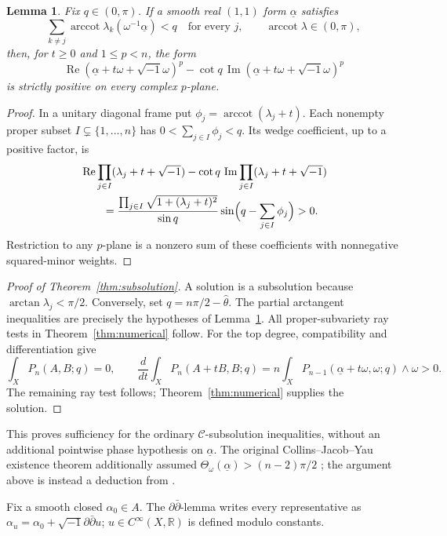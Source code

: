 \documentclass[12pt,reqno]{amsart}
\numberwithin{equation}{section}
\theoremstyle{plain}
\newtheorem{lemma}[theorem]{Lemma}
\theoremstyle{definition}
\theoremstyle{remark}
\newcommand{\ii}{\sqrt{-1}}
\newcommand{\ddc}{\ii\partial\bar\partial}
\newcommand{\R}{\mathbb R}
\newcommand{\Rea}{\operatorname{Re}}
\newcommand{\Ima}{\operatorname{Im}}
\begin{document}
\begin{lemma}\label{lem:positive}
Fix $q\in(0,\pi)$. If a smooth real $(1,1)$ form $\underline\alpha$ satisfies
\[
 \sum_{k\ne j}\operatorname{arccot}\lambda_k(\omega^{-1}\underline\alpha)<q
 \quad\text{for every }j,
 \qquad\operatorname{arccot}\lambda\in(0,\pi),
\]
then, for $t\ge0$ and $1\le p<n$, the form
\[
 \Rea(\underline\alpha+t\omega+\ii\omega)^p
 -\cot q\,\Ima(\underline\alpha+t\omega+\ii\omega)^p
\]
is strictly positive on every complex $p$-plane.
\end{lemma}
\begin{proof}\label{proof:positive}
In a unitary diagonal frame put $\phi_j=\operatorname{arccot}(\lambda_j+t)$.
Each nonempty proper subset $I\subsetneq\{1,\ldots,n\}$ has $0<\sum_{j\in I}\phi_j<q$.
Its wedge coefficient, up to a positive factor, is
\[
 \begin{aligned}
 &\Rea\prod_{j\in I}(\lambda_j+t+\ii)
 -\cot q\,\Ima\prod_{j\in I}(\lambda_j+t+\ii)\\
 &\qquad=\frac{\prod_{j\in I}\sqrt{1+(\lambda_j+t)^2}}{\sin q}
   \sin\Bigl(q-\sum_{j\in I}\phi_j\Bigr)>0.
 \end{aligned}
\]
Restriction to any $p$-plane is a nonzero sum of these coefficients with nonnegative squared-minor weights.
\end{proof}

\begin{proof}[Proof of Theorem~\ref{thm:subsolution}]\label{proof:subsolution}
A solution is a subsolution because $\arctan\lambda_j<\pi/2$.
Conversely, set $q=n\pi/2-\widehat\theta$. The partial arctangent inequalities are precisely the hypotheses of Lemma~\ref{lem:positive}. All proper-subvariety ray tests in Theorem~\ref{thm:numerical} follow. For the top degree, compatibility and differentiation give
\[
 \int_X P_n(A,B;q)=0,\qquad
 \frac{d}{dt}\int_XP_n(A+tB,B;q)
 =n\int_XP_{n-1}(\underline\alpha+t\omega,\omega;q)\wedge\omega>0.
\]
The remaining ray test follows; Theorem~\ref{thm:numerical} supplies the solution.
\end{proof}
This proves sufficiency for the ordinary $\mathcal C$-subsolution inequalities, without an additional pointwise phase hypothesis on $\underline\alpha$.
The original Collins--Jacob--Yau existence theorem additionally assumed
$\Theta_\omega(\underline\alpha)>(n-2)\pi/2$ \cite[Theorem 1.2]{CJY}; the argument above is instead a deduction from \cite[Theorem 1.3]{CLT}.

Fix a smooth closed $\alpha_0\in A$. The $\partial\bar\partial$-lemma
writes every representative as $\alpha_u=\alpha_0+\ddc u$;
$u\in C^\infty(X,\R)$ is defined modulo constants.
\end{document}
